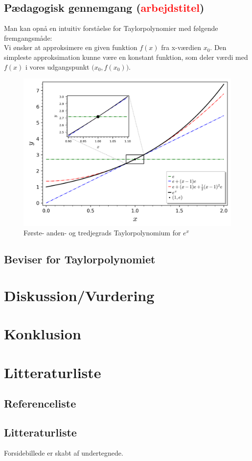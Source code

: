 \documentclass[12pt, a4paper]{article}
\begin{document}
\subsection{Pædagogisk gennemgang (\textcolor{red}{arbejdstitel})}
Man kan opnå en intuitiv forståelse for Taylorpolynomier med følgende fremgangsmåde:\\
Vi ønsker at approksimere en given funktion $f(x)$ fra x-værdien $x_0$. Den simpleste approksimation kunne være en konstant funktion, som deler værdi med $f(x)$ i vores udgangspunkt $\big(x_0,f(x_0)\big)$.
\begin{figure}
     \includegraphics[width=\textwidth]{figures/ex-eksempel.png}
     \caption{Første- anden- og tredjegrads Taylorpolynomium for $e^x$}
     \label{fig:boat1}
\end{figure}
\subsection{Beviser for Taylorpolynomiet}
\section{Diskussion/Vurdering} %
\section{Konklusion} %

\section{Litteraturliste}
\subsection{Referenceliste}
\printbibliography
\subsection{Litteraturliste}
Forsidebillede er skabt af undertegnede.
\end{document}
